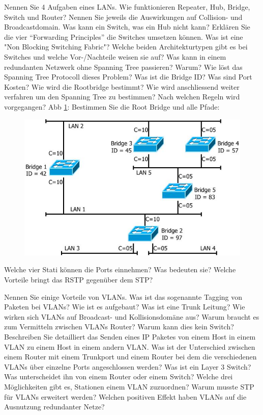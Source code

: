\documentclass[ngerman,a4paper,12pt]{scrreprt}
\begin{document}
\olR
	\li Nennen Sie 4 Aufgaben eines LANs.
	\li Wie funktionieren Repeater, Hub, Bridge, Switch und Router? Nennen Sie jeweils die Auswirkungen auf Collision- und Broadcastdomain.
	\li Was kann ein Switch, was ein Hub nicht kann?
	\li Erklären Sie die vier "`Forwarding Principles"' die Switches umsetzen können.
	\li Was ist eine "Non Blocking Switching Fabric"?
	\li Welche beiden Architekturtypen gibt es bei Switches und welche Vor-/Nachteile weisen sie auf?
\olS
{}
\olR
	\li Was kann in einem redundanten Netzwerk ohne Spanning Tree passieren? Warum? Wie löst das Spanning Tree Protocoll dieses Problem?
	\li Was ist die Bridge ID? Was sind Port Kosten?
	\li Wie wird die Rootbridge bestimmt? Wie wird anschliessend weiter verfahren um den Spanning Tree zu bestimmen? Nach welchen Regeln wird vorgegangen?
	\li Abb \ref{stpex1}: Bestimmen Sie die Root Bridge und alle Pfade:
	\begin{figure}[H]
		\centering
		\includegraphics[scale=0.60]{img/R4.1.jpg}
		\caption{}
		\label{stpex1}
	\end{figure}
	\li Welche vier Stati können die Ports einnehmen? Was bedeuten sie?
	\li Welche Vorteile bringt das RSTP gegenüber dem STP?
\olS


\olR
	\li Nennen Sie einige Vorteile von VLANs.
	\li Was ist das sogenannte Tagging von Paketen bei VLANs? Wie ist es aufgebaut?
	\li Was ist eine Trunk Leitung?
	\li Wie wirken sich VLANs auf Broadcast- und Kollisionsdomäne aus?
	\li Warum braucht es zum Vermitteln zwischen VLANs Router? Warum kann dies kein Switch?
	\li Beschreiben Sie detailliert das Senden eines IP Paketes von einem Host in einem VLAN zu einem Host in einem andern VLAN.
	\li Was ist der Unterschied zwischen einem Router mit einem Trunkport und einem Router bei dem die verschiedenen VLANs über einzelne Ports angeschlossen werden?
	\li Was ist ein Layer 3 Switch? Was unterscheidet ihn von einem Router oder einem Switch?
	\li Welche drei Möglichkeiten gibt es, Stationen einem VLAN zuzuordnen?
	\li  Warum musste STP für VLANs erweitert werden? Welchen positiven Effekt haben VLANs auf die Ausnutzung redundanter Netze?
\olS
\end{document}
